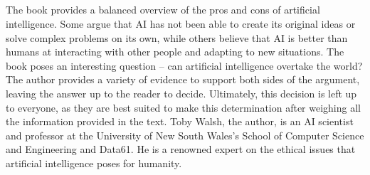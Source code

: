 \documentclass[12pt,letterpaper]{article}
\begin{document}
\subsection*{}
The book provides a balanced overview of the pros and cons of artificial intelligence. Some argue that AI has not been able to create its original ideas or solve complex problems on its own, while others believe that AI is better than humans at interacting with other people and adapting to new situations. The book poses an interesting question – can artificial intelligence overtake the world? The author provides a variety of evidence to support both sides of the argument, leaving the answer up to the reader to decide. Ultimately, this decision is left up to everyone, as they are best suited to make this determination after weighing all the information provided in the text. Toby Walsh, the author, is an AI scientist and professor at the University of New South Wales’s School of Computer Science and Engineering and Data61. He is a renowned expert on the ethical issues that artificial intelligence poses for humanity.


 
\end{document}
